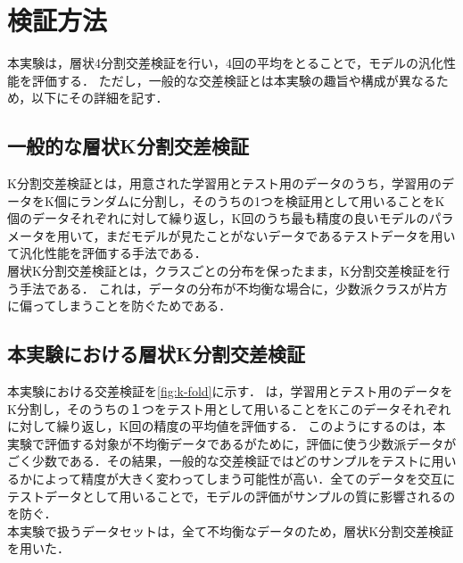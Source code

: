 \section{検証方法}
本実験は，層状4分割交差検証を行い，4回の平均をとることで，モデルの汎化性能を評価する．
ただし，一般的な交差検証とは本実験の趣旨や構成が異なるため，以下にその詳細を記す．

\subsection{一般的な層状K分割交差検証}
K分割交差検証とは，用意された学習用とテスト用のデータのうち，学習用のデータをK個にランダムに分割し，そのうちの1つを検証用として用いることをK個のデータそれぞれに対して繰り返し，K回のうち最も精度の良いモデルのパラメータを用いて，まだモデルが見たことがないデータであるテストデータを用いて汎化性能を評価する手法である．\\

層状K分割交差検証とは，クラスごとの分布を保ったまま，K分割交差検証を行う手法である．
これは，データの分布が不均衡な場合に，少数派クラスが片方に偏ってしまうことを防ぐためである．


\subsection{本実験における層状K分割交差検証}
本実験における交差検証を\ref{fig:k-fold}に示す． は，学習用とテスト用のデータをK分割し，そのうちの１つをテスト用として用いることをKこのデータそれぞれに対して繰り返し，K回の精度の平均値を評価する．
このようにするのは，本実験で評価する対象が不均衡データであるがために，評価に使う少数派データがごく少数である．その結果，一般的な交差検証ではどのサンプルをテストに用いるかによって精度が大きく変わってしまう可能性が高い．全てのデータを交互にテストデータとして用いることで，モデルの評価がサンプルの質に影響されるのを防ぐ．\\
本実験で扱うデータセットは，全て不均衡なデータのため，層状K分割交差検証を用いた．

